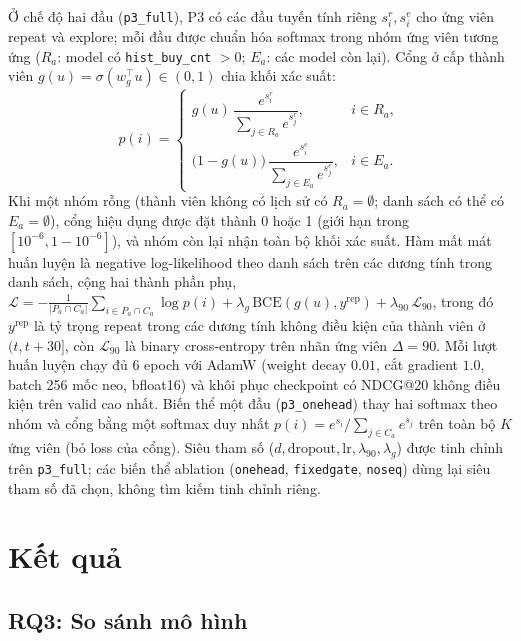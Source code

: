 \documentclass[jtehm]{ieeeaccess}
\begin{document}
Ở chế độ hai đầu (\texttt{p3\_full}), P3 có các đầu tuyến tính riêng $s^r_i, s^e_i$ cho ứng viên repeat và explore; mỗi đầu được chuẩn hóa softmax trong nhóm ứng viên tương ứng ($R_a$: model có \texttt{hist\_buy\_cnt} $> 0$; $E_a$: các model còn lại). Cổng ở cấp thành viên $g(u) = \sigma(w_g^\top u) \in (0, 1)$ chia khối xác suất:
\begin{equation}
p(i) = \begin{cases}
g(u)\, \dfrac{e^{s^{r}_i}}{\sum_{j \in R_a} e^{s^{r}_j}}, & i \in R_a,\\[2ex]
\bigl(1 - g(u)\bigr)\, \dfrac{e^{s^{e}_i}}{\sum_{j \in E_a} e^{s^{e}_j}}, & i \in E_a.
\end{cases}
\end{equation}
Khi một nhóm rỗng (thành viên không có lịch sử có $R_a = \emptyset$; danh sách có thể có $E_a = \emptyset$), cổng hiệu dụng được đặt thành 0 hoặc 1 (giới hạn trong $[10^{-6}, 1-10^{-6}]$), và nhóm còn lại nhận toàn bộ khối xác suất. Hàm mất mát huấn luyện là negative log-likelihood theo danh sách trên các dương tính trong danh sách, cộng hai thành phần phụ, $\mathcal{L} = -\frac{1}{|P_a \cap C_a|}\sum_{i \in P_a \cap C_a} \log p(i) + \lambda_g\,\mathrm{BCE}(g(u), y^{\mathrm{rep}})
+ \lambda_{90}\,\mathcal{L}_{90}$, trong đó $y^{\mathrm{rep}}$ là tỷ trọng repeat trong các dương tính không điều kiện của thành viên ở $(t, t+30]$, còn $\mathcal{L}_{90}$ là binary cross-entropy trên nhãn ứng viên $\Delta = 90$. Mỗi lượt huấn luyện chạy đủ 6 epoch với AdamW ($\text{weight decay } 0.01$, cắt gradient $1.0$, batch 256 mốc neo, bfloat16) và khôi phục checkpoint có NDCG@20 không điều kiện trên valid cao nhất. Biến thể một đầu (\texttt{p3\_onehead}) thay hai softmax theo nhóm và cổng bằng một softmax duy nhất $p(i) = e^{s_i}/\sum_{j \in C_a} e^{s_j}$ trên toàn bộ $K$ ứng viên (bỏ loss của cổng). Siêu tham số ($d, \text{dropout}, \text{lr}, \lambda_{90}, \lambda_g$) được tinh chỉnh trên \texttt{p3\_full}; các biến thể ablation (\texttt{onehead}, \texttt{fixedgate}, \texttt{noseq}) dùng lại siêu tham số đã chọn, không tìm kiếm tinh chỉnh riêng.

\section{Kết quả}
\label{sec:results}

\subsection{RQ3: So sánh mô hình}
\end{document}
